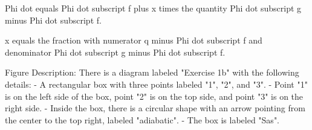 Phi dot equals Phi dot subscript f plus x times the quantity Phi dot subscript g minus Phi dot subscript f.

x equals the fraction with numerator q minus Phi dot subscript f and denominator Phi dot subscript g minus Phi dot subscript f.

Figure Description:
There is a diagram labeled "Exercise 1b" with the following details:
- A rectangular box with three points labeled "1", "2", and "3".
- Point "1" is on the left side of the box, point "2" is on the top side, and point "3" is on the right side.
- Inside the box, there is a circular shape with an arrow pointing from the center to the top right, labeled "adiabatic".
- The box is labeled "Sas".